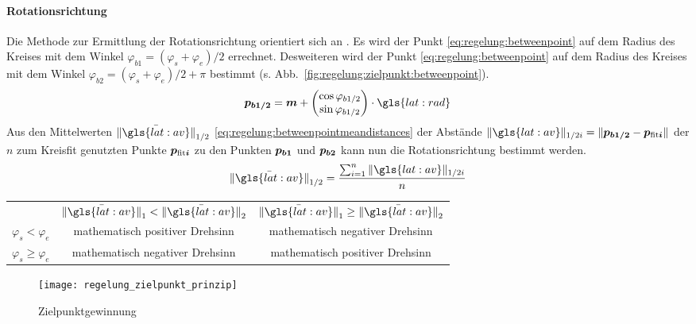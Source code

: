 \paragraph{Rotationsrichtung}
Die Methode zur Ermittlung der Rotationsrichtung orientiert sich an \autocite{drauschkeEchtzeitfaehigeStartpunktalgorithmenFuer2016}. Es wird der Punkt  \eqref{eq:regelung:betweenpoint} auf dem Radius des Kreises mit dem Winkel \(  \varphi_{b1} = (\varphi_s + \varphi_e)/2 \) errechnet.
Desweiteren wird der Punkt  \eqref{eq:regelung:betweenpoint} auf dem Radius des Kreises mit dem Winkel \(  \varphi_{b2} = (\varphi_s + \varphi_e)/2 + \pi \) bestimmt (s. Abb.~\ref{fig:regelung:zielpunkt:betweenpoint}).
\begin{equation} \label{eq:regelung:betweenpoint}
\pnt{p_{b1/2}} = \pnt{m} + 
\begin{pmatrix}
\cos{\varphi_{b1/2}} \\
\sin{\varphi_{b1/2}}
\end{pmatrix}
\cdot \gls{lat:rad}
\end{equation}
Aus den Mittelwerten \( \mean{\nrm{\gls{lat:av}}}_{1/2} \) \eqref{eq:regelung:betweenpointmeandistances} der Abstände \( \nrm{\gls{lat:av}}_{1/2i} = \nrm{\pnt{p_{b1/2}} - \pnt{p_{\text{fit}i}}} \) der \(n\) zum Kreisfit genutzten Punkte \(\boldsymbol{p_{\text{fit}i}}\) zu den Punkten \(\boldsymbol{p_{b1}}\) und \(\boldsymbol{p_{b2}}\) kann nun die Rotationsrichtung bestimmt werden.
\begin{equation} \label{eq:regelung:betweenpointmeandistances}
\mean{\nrm{\gls{lat:av}}}_{1/2} = \frac{\sum_{i=1}^n \nrm{\gls{lat:av}}_{1/2i}}{n} 
\end{equation}
\begin{tabular}{ccc}
& \(\mean{\nrm{\gls{lat:av}}}_{1}<\mean{\nrm{\gls{lat:av}}}_{2}\) & 
\(\mean{\nrm{\gls{lat:av}}}_{1}\geq \mean{\nrm{\gls{lat:av}}}_{2}\) \\
\(\varphi_s<\varphi_e\) &  mathematisch positiver Drehsinn & mathematisch negativer Drehsinn \\
\(\varphi_s\geq \varphi_e\) &  mathematisch negativer Drehsinn & mathematisch positiver Drehsinn
\end{tabular}

\begin{figure}[htb]
  \centering
  \texttt{[image: regelung\_zielpunkt\_prinzip]}
  \caption{Zielpunktgewinnung}
  \label{fig:regelung:zielpunkt:zielpunktgewinnung}
\end{figure}

